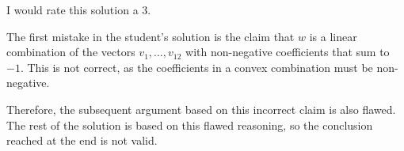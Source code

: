 I would rate this solution a 3.

The first mistake in the student's solution is the claim that $w$ is a linear combination of the vectors $v_1, \dots, v_{12}$ with non-negative coefficients that sum to $-1$. This is not correct, as the coefficients in a convex combination must be non-negative. 

Therefore, the subsequent argument based on this incorrect claim is also flawed. The rest of the solution is based on this flawed reasoning, so the conclusion reached at the end is not valid.
